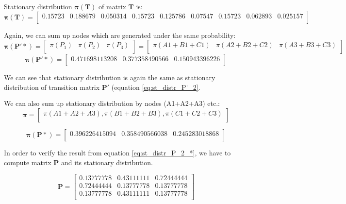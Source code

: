 \documentclass{article}
\begin{document}
Stationary distribution $\mathbf{\pi(T)}$ of matrix $\mathbf{T}$ is:
\[\mathbf{\pi(T)} = \begin{bmatrix}
	0.15723 & 0.188679 & 0.050314 & 0.15723 &  0.125786 & 0.07547 & 0.15723 &  0.062893 & 0.025157\\
	\end{bmatrix}
\]


Again, we can sum up nodes which are generated under the same probability:                   
\[\mathbf{\pi(P'*)} = 
\begin{bmatrix}
\pi(P_1) & \pi(P_2) & \pi(P_3) \\
\end{bmatrix}
= \begin{bmatrix}
\pi(A1+B1+C1) & \pi(A2 + B2+C2) & \pi(A3 + B3 + C3) \\
\end{bmatrix}
\]
\[\mathbf{\pi(P'*)} = 
\begin{bmatrix}
0.471698113208 & 0.377358490566 & 0.150943396226 \\
\end{bmatrix}
\]

We can see that stationary distribution is again the same as stationary distribution of transition matrix $\mathbf{P'}$ (equation \ref{eq:st_distr_P'_2}.

We can also sum up stationary distribution by nodes (A1+A2+A3) etc.:
\[\mathbf{\pi} = 
\begin{bmatrix}
\pi(A1+A2+A3), \pi(B1+B2+B3), \pi(C1+C2+C3) \\
\end{bmatrix}
\]

\begin{equation}
\mathbf{\pi(P*)} = 
\begin{bmatrix}
0.396226415094 & 0.358490566038 & 0.245283018868 \\
\end{bmatrix}
\label{eq:st_distr_P_2_*}
\end{equation}

In order to verify the result from equation \ref{eq:st_distr_P_2_*}, we have to compute matrix $\mathbf{P}$ and its stationary distribution.


\[\mathbf{P}=
\begin{bmatrix}
    0.13777778 &  0.43111111 &  0.72444444 \\
    0.72444444 & 0.13777778 & 0.13777778  \\
    0.13777778 & 0.43111111 & 0.13777778 \\
\end{bmatrix}
\]
\end{document}

